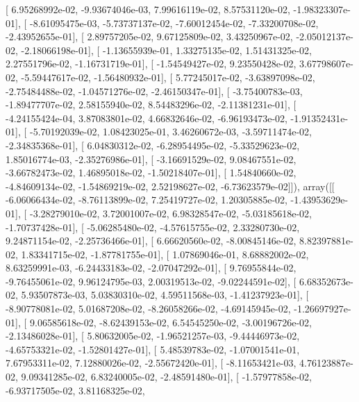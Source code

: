 \documentclass{article}
\begin{document}
       [  6.95268992e-02,  -9.93674046e-03,   7.99616119e-02,
          8.57531120e-02,  -1.98323307e-01],
       [ -8.61095475e-03,  -5.73737137e-02,  -7.60012454e-02,
         -7.33200708e-02,  -2.43952655e-01],
       [  2.89757205e-02,   9.67125809e-02,   3.43250967e-02,
         -2.05012137e-02,  -2.18066198e-01],
       [ -1.13655939e-01,   1.33275135e-02,   1.51431325e-02,
          2.27551796e-02,  -1.16731719e-01],
       [ -1.54549427e-02,   9.23550428e-02,   3.67798607e-02,
         -5.59447617e-02,  -1.56480932e-01],
       [  5.77245017e-02,  -3.63897098e-02,  -2.75484488e-02,
         -1.04571276e-02,  -2.46150347e-01],
       [ -3.75400783e-03,  -1.89477707e-02,   2.58155940e-02,
          8.54483296e-02,  -2.11381231e-01],
       [ -4.24155424e-04,   3.87083801e-02,   4.66832646e-02,
         -6.96193473e-02,  -1.91352431e-01],
       [ -5.70192039e-02,   1.08423025e-01,   3.46260672e-03,
         -3.59711474e-02,  -2.34835368e-01],
       [  6.04830312e-02,  -6.28954495e-02,  -5.33529623e-02,
          1.85016774e-03,  -2.35276986e-01],
       [ -3.16691529e-02,   9.08467551e-02,  -3.66782473e-02,
          1.46895018e-02,  -1.50218407e-01],
       [  1.54840660e-02,  -4.84609134e-02,  -1.54869219e-02,
          2.52198627e-02,  -6.73623579e-02]]), array([[ -6.06066434e-02,  -8.76113899e-02,   7.25419727e-02,
          1.20305885e-02,  -1.43953629e-01],
       [ -3.28279010e-02,   3.72001007e-02,   6.98328547e-02,
         -5.03185618e-02,  -1.70737428e-01],
       [ -5.06285480e-02,  -4.57615755e-02,   2.33280730e-02,
          9.24871154e-02,  -2.25736466e-01],
       [  6.66620560e-02,  -8.00845146e-02,   8.82397881e-02,
          1.83341715e-02,  -1.87781755e-01],
       [  1.07869046e-01,   8.68882002e-02,   8.63259991e-03,
         -6.24433183e-02,  -2.07047292e-01],
       [  9.76955844e-02,  -9.76455061e-02,   9.96124795e-03,
          2.00319513e-02,  -9.02244591e-02],
       [  6.68352673e-02,   5.93507873e-03,   5.03830310e-02,
          4.59511568e-03,  -1.41237923e-01],
       [ -8.90778081e-02,   5.01687208e-02,  -8.26058266e-02,
         -4.69145945e-02,  -1.26697927e-01],
       [  9.06585618e-02,  -8.62439153e-02,   6.54545250e-02,
         -3.00196726e-02,  -2.13486028e-01],
       [  5.80632005e-02,  -1.96521257e-03,  -9.44446973e-02,
         -4.65753321e-02,  -1.52801427e-01],
       [  5.48539783e-02,  -1.07001541e-01,   7.67953311e-02,
          7.12880026e-02,  -2.55672420e-01],
       [ -8.11653421e-03,   4.76123887e-02,   9.09341285e-02,
          6.83240005e-02,  -2.48591480e-01],
       [ -1.57977858e-02,  -6.93717505e-02,   3.81168325e-02,
\end{document}
